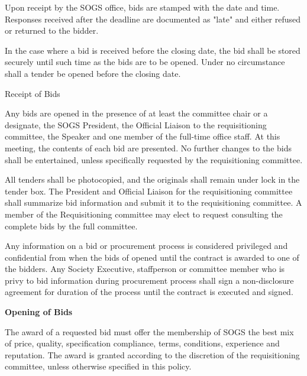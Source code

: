 \begin{longenum}[label*=\thesection.\arabic*., align=left]
\begin{longenum} [label*=\arabic*., align=left]
		\item Upon receipt by the SOGS office, bids are stamped with the date and time. Responses received after the deadline are documented as "late" and either refused or returned to the bidder.
		
		\item In the case where a bid is received before the closing date, the bid shall be stored securely until such time as the bids are to be opened. Under no circumstance shall a tender be opened before the closing date.
\end{longenum}

\item \textbf\textit{}{Receipt of Bids}

\begin{longenum} [label*=\arabic*., align=left]
		\item Any bids are opened in the presence of at least the committee chair or a designate, the SOGS President, the Official Liaison to the requisitioning committee, the Speaker and one member of the full-time office staff. At this meeting, the contents of each bid are presented. No further changes to the bids shall be entertained, unless specifically requested by the requisitioning committee. 
		
		\item All tenders shall be photocopied, and the originals shall remain under lock in the tender box. The President and Official Liaison for the requisitioning committee shall summarize bid information and submit it to the requisitioning committee. A member of the Requisitioning committee may elect to request consulting the complete bids by the full committee.
		
		\item Any information on a bid or procurement process is considered privileged and confidential from when the bids of opened until the contract is awarded to one of the bidders. Any Society Executive, staffperson or committee member who is privy to bid information during procurement process shall sign a non-disclosure agreement for duration of the process until the contract is executed and signed. 
\end{longenum}

\item \textbf{Opening of Bids}

\begin{longenum} [label*=\arabic*., align=left]
		\item The award of a requested bid must offer the membership of SOGS the best mix of price, quality, specification compliance, terms, conditions, experience and reputation. The award is granted according to the discretion of the requisitioning committee, unless otherwise specified in this policy. 
		

\end{longenum}
\end{longenum}
